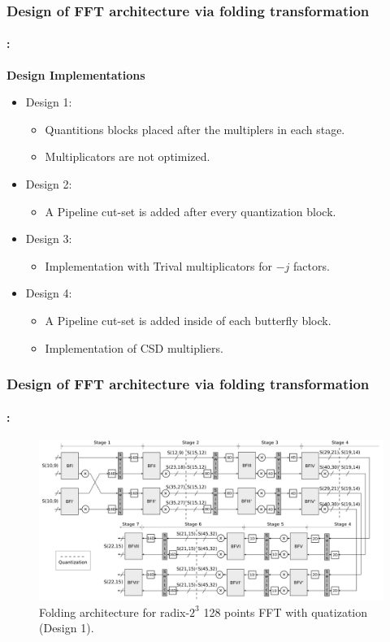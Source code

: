 \begin{frame}
	\frametitle{\textbf{Design of FFT architecture via folding transformation}}
	\framesubtitle{\secname : \subsecname}
	\begin{block}{\centering \textbf{Design Implementations}}
		\begin{itemize}\justifying\footnotesize
        	\item Design 1: 
        	\begin{itemize}\justifying\footnotesize
        		\item Quantitions blocks placed after the multiplers in each stage.
        		\item Multiplicators are not optimized.
			\end{itemize}        		 
        	\item Design 2:
			\begin{itemize}\justifying\footnotesize
				\item  A Pipeline cut-set is added after every quantization block.
			\end{itemize}				        	
        	\item Design 3:
        	\begin{itemize}\justifying\footnotesize
     			\item Implementation with Trival multiplicators for $-j$ factors. 
			\end{itemize}
        	\item Design 4:
        	\begin{itemize}\justifying\footnotesize
				\item A Pipeline cut-set is added inside of each butterfly block.				
				\item  Implementation of CSD multipliers.
			\end{itemize}
		\end{itemize}        	
	\end{block}
\end{frame}



\begin{frame}
	\frametitle{\textbf{Design of FFT architecture via folding transformation}}
	\framesubtitle{\secname : \subsecname}
	\vspace{-0.5cm}
		\begin{figure}[h!] \centering
		   	\includegraphics[width=0.95\paperwidth]{./image/folding-128-quant.png}
		   	\caption{ \tiny Folding architecture for radix-$2^3$  128 points FFT with quatization (Design 1).}
		\end{figure}  	
\end{frame}


